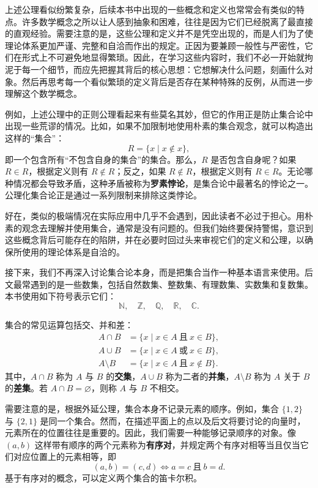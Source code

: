 上述公理看似纷繁复杂，后续本书中出现的一些概念和定义也常常会有类似的特点。许多数学概念之所以让人感到抽象和困难，往往是因为它们已经脱离了最直接的直观经验。需要注意的是，这些公理和定义并不是凭空出现的，而是人们为了使理论体系更加严谨、完整和自洽而作出的规定。正因为要兼顾一般性与严密性，它们在形式上不可避免地显得繁琐。因此，在学习这些内容时，我们不必一开始就拘泥于每一个细节，而应先把握其背后的核心思想：它想解决什么问题，刻画什么对象。然后再思考每一个看似繁琐的定义背后是否存在某种特殊的反例，从而进一步理解这个数学概念。

例如，上述公理中的正则公理看起来有些莫名其妙，但它的作用正是防止集合论中出现一些荒谬的情况。比如，如果不加限制地使用朴素的集合观念，就可以构造出这样的``集合''：
\[
    R=\{x\mid x\notin x\},
\]
即一个包含所有``不包含自身的集合''的集合。那么，\(R\) 是否包含自身呢？如果 \(R \in R\)，根据定义则有 \(R \notin R\)；反之，如果 \(R \notin R\)，根据定义则有 \(R \in R\)。无论哪种情况都会导致矛盾，这种矛盾被称为\textbf{罗素悖论}，是集合论中最著名的悖论之一。公理化集合论正是通过一系列限制来排除这类悖论。

好在，类似的极端情况在实际应用中几乎不会遇到，因此读者不必过于担心。用朴素的观念去理解并使用集合，通常是没有问题的。但我们始终要保持警惕，意识到这些概念背后可能存在的陷阱，并在必要时回过头来审视它们的定义和公理，以确保所使用的理论体系是自洽的。

接下来，我们不再深入讨论集合论本身，而是把集合当作一种基本语言来使用。后文最常遇到的是一些数集，包括自然数集、整数集、有理数集、实数集和复数集。本书使用如下符号表示它们：
\[
    \mathbb{N},\quad \mathbb{Z},\quad \mathbb{Q},\quad \mathbb{R},\quad \mathbb{C}.
\]

集合的常见运算包括交、并和差：
\begin{align*}
    A\cap B
     & =\{x\mid x\in A\ \text{且}\ x\in B\},    \\
    A\cup B
     & =\{x\mid x\in A\ \text{或}\ x\in B\},    \\
    A\setminus B
     & =\{x\mid x\in A\ \text{且}\ x\notin B\}.
\end{align*}
其中，\(A\cap B\) 称为 \(A\) 与 \(B\) 的\textbf{交集}，\(A\cup B\) 称为二者的\textbf{并集}，\(A\setminus B\) 称为 \(A\) 关于 \(B\) 的\textbf{差集}。若 \(A\cap B=\varnothing\)，则称 \(A\) 与 \(B\) 不相交。

需要注意的是，根据外延公理，集合本身不记录元素的顺序。例如，集合 \(\{1,2\}\) 与 \(\{2,1\}\) 是同一个集合。然而，在描述平面上的点以及后文将要讨论的向量时，元素所在的位置往往是重要的。因此，我们需要一种能够记录顺序的对象。像 \((a,b)\) 这样带有顺序的两个元素称为\textbf{有序对}，并规定两个有序对相等当且仅当它们对应位置上的元素相等，即
\[
    (a,b)=(c,d)\iff a=c\ \text{且}\ b=d.
\]
基于有序对的概念，可以定义两个集合的笛卡尔积。

